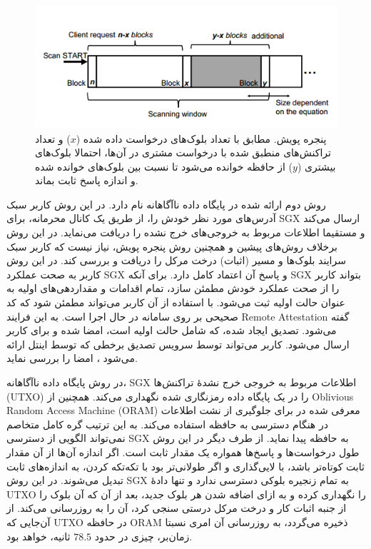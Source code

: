 \begin{figure}[h]
	\centering
	\includegraphics[width=0.7\linewidth]{image/Scanning_Window}
	\caption[پنجره پویش () ]{پنجره پویش. مطابق با تعداد بلوک‌های درخواست داده شده ($x$) و تعداد تراکنش‌های منطبق شده با درخواست مشتری در آن‌ها، احتمالا بلوک‌های بیشتری ($y$) از حافظه خوانده می‌شود تا نسبت بین بلوک‌های خوانده شده و اندازه پاسخ ثابت بماند\cite{Matetic2019}.}
	\label{fig:scanningwindow}
\end{figure}

روش دوم ارائه شده در \cite{Matetic2019} پایگاه داده ناآگاهانه نام دارد. در این روش کاربر سبک آدرس‌های مورد نظر خودش را، از طریق یک کانال محرمانه، برای SGX ارسال می‌کند و مستقیما اطلاعات مربوط به خروجی‌های خرج نشده را دریافت می‌نماید. در این روش برخلاف روش‌های پیشین و همچنین روش پنجره پویش،‌ نیاز نیست که کاربر سبک سرایند بلوک‌ها و مسیر (اثبات) درخت مرکل را دریافت و بررسی کند. در این روش کاربر به صحت عملکرد SGX و پاسخ آن اعتماد کامل دارد.
برای آنکه SGX بتواند کاربر را از صحت عملکرد خودش مطمئن سازد، 
تمام اقدامات و مقداردهی‌های اولیه به عنوان حالت اولیه ثبت می‌شود. با استفاده از آن کاربر می‌تواند مطمئن شود که کد صحیحی بر روی سامانه در حال اجرا است. به این فرایند 
\gls{Remote Attestation}
گفته می‌شود. تصدیق ایجاد شده، که شامل حالت اولیه است، امضا شده و برای کاربر ارسال می‌شود. کاربر می‌تواند توسط سرویس تصدیق برخطی که توسط اینتل ارائه می‌شود \cite{EPID}، امضا را بررسی نماید.

در روش پایگاه داده ناآگاهانه، SGX اطلاعات مربوط به خروجی خرج نشدهٔ تراکنش‌ها (UTXO) را در یک پایگاه داده رمزنگاری شده نگهداری می‌کند. همچنین از 
\gls{Oblivious Random Access Machine (ORAM)}
معرفی شده در \cite{Stefanov2013} برای جلوگیری از نشت اطلاعات در هنگام دسترسی به حافظه استفاده می‌کند. به این ترتیب گره کامل متخاصم نمی‌تواند الگویی از دسترسی SGX به حافظه پیدا نماید. از طرف دیگر در این روش طول درخواست‌ها و پاسخ‌ها همواره یک مقدار ثابت است. اگر اندازه آن‌ها از آن مقدار ثابت کوتاه‌تر باشد، با لایی‌گذاری و اگر طولانی‌تر بود با تکه‌تکه کردن، به اندازه‌های ثابت تبدیل می‌شوند. در این روش SGX به تمام زنجیره بلوکی دسترسی ندارد و تنها دادهٔ UTXO را نگهداری کرده و به ازای اضافه شدن هر بلوک جدید، بعد از آن که آن بلوک را از جنبه اثبات کار و درخت مرکل درستی سنجی کرد، آن را به روزرسانی می‌کند. از آن‌جایی که UTXO در حافظه ORAM ذخیره می‌گردد، به روزرسانی آن امری نسبتا زمان‌بر، چیزی در حدود $78.5$ ثانیه، خواهد بود.

